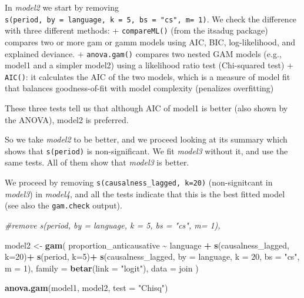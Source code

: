 \documentclass[
]{article}
\newenvironment{Shaded}{\begin{snugshade}}{\end{snugshade}}
\newcommand{\AttributeTok}[1]{\textcolor[rgb]{0.13,0.29,0.53}{#1}}
\newcommand{\CommentTok}[1]{\textcolor[rgb]{0.56,0.35,0.01}{\textit{#1}}}
\newcommand{\DecValTok}[1]{\textcolor[rgb]{0.00,0.00,0.81}{#1}}
\newcommand{\FunctionTok}[1]{\textcolor[rgb]{0.13,0.29,0.53}{\textbf{#1}}}
\newcommand{\NormalTok}[1]{#1}
\newcommand{\OtherTok}[1]{\textcolor[rgb]{0.56,0.35,0.01}{#1}}
\newcommand{\SpecialCharTok}[1]{\textcolor[rgb]{0.81,0.36,0.00}{\textbf{#1}}}
\newcommand{\StringTok}[1]{\textcolor[rgb]{0.31,0.60,0.02}{#1}}
\begin{document}
In \emph{model2} we start by removing
\texttt{s(period,\ by\ =\ language,\ k\ =\ 5,\ bs\ =\ "cs",\ m=\ 1)}. We
check the difference with three different methods: +
\texttt{compareML()} (from the itsadug package) compares two or more gam
or gamm models using AIC, BIC, log-likelihood, and explained deviance. +
\texttt{anova.gam()} compares two nested GAM models (e.g., model1 and a
simpler model2) using a likelihood ratio test (Chi-squared test) +
\texttt{AIC()}: it calculates the AIC of the two models, which is a
measure of model fit that balances goodness-of-fit with model complexity
(penalizes overfitting)

These three tests tell us that although AIC of model1 is better (also
shown by the ANOVA), model2 is preferred.

So we take \emph{model2} to be better, and we proceed looking at its
summary which shows that \texttt{s(period)} is non-significant. We fit
\emph{model3} without it, and use the same tests. All of them show that
\emph{model3} is better.

We proceed by removing \texttt{s(causalness\_lagged,\ k=20)}
(non-signitcant in \emph{model3}) in \emph{model4}, and all the tests
indicate that this is the best fitted model (see also the
\texttt{gam.check} output).

\begin{Shaded}
\begin{Highlighting}[]
\CommentTok{\#remove s(period, by = language, k = 5, bs = "cs", m= 1),   }

\NormalTok{model2 }\OtherTok{\textless{}{-}} \FunctionTok{gam}\NormalTok{(}
\NormalTok{  proportion\_anticausative }\SpecialCharTok{\textasciitilde{}} 
\NormalTok{    language }\SpecialCharTok{+} 
    \FunctionTok{s}\NormalTok{(causalness\_lagged, }\AttributeTok{k=}\DecValTok{20}\NormalTok{)}\SpecialCharTok{+}
    \FunctionTok{s}\NormalTok{(period, }\AttributeTok{k=}\DecValTok{5}\NormalTok{)}\SpecialCharTok{+}
    \FunctionTok{s}\NormalTok{(causalness\_lagged, }\AttributeTok{by =}\NormalTok{ language, }\AttributeTok{k =} \DecValTok{20}\NormalTok{, }\AttributeTok{bs =} \StringTok{"cs"}\NormalTok{, }\AttributeTok{m =} \DecValTok{1}\NormalTok{),}
  \AttributeTok{family =} \FunctionTok{betar}\NormalTok{(}\AttributeTok{link =} \StringTok{"logit"}\NormalTok{),                 }
  \AttributeTok{data =}\NormalTok{ join}
\NormalTok{)}

\FunctionTok{anova.gam}\NormalTok{(model1, model2, }\AttributeTok{test =} \StringTok{"Chisq"}\NormalTok{) }
\end{Highlighting}
\end{Shaded}
\end{document}
